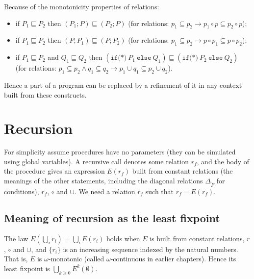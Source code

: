 Because of the monotonicity properties of relations:
\begin{itemize}
  \item if $P_1 \sqsubseteq P_2$ then $(P_1; P) \sqsubseteq (P_2; P)$ (for relations: $p_1 \subseteq p_2 \rightarrow p_1 \circ p \subseteq p_2 \circ p$);
  \item if $P_1 \sqsubseteq P_2$ then $(P; P_1) \sqsubseteq (P; P_2)$ (for relations: $p_1 \subseteq p_2 \rightarrow p \circ p_1 \subseteq p \circ p_2$);
  \item if $P_1 \sqsubseteq P_2$ and $Q_1 \sqsubseteq Q_2$ then $(\texttt{if(*)}\ P_1\ \texttt{else}\ Q_1) \sqsubseteq (\texttt{if(*)}\ P_2\ \texttt{else}\ Q_2)$ (for relations: $p_1 \subseteq p_2 \wedge q_1 \subseteq q_2 \rightarrow p_1 \cup q_1 \subseteq p_2 \cup q_2$).
\end{itemize}
Hence a part of a program can be replaced by a refinement of it in any context built from these constructs.
 
\section{Recursion}
 
For simplicity assume procedures have no parameters (they can be simulated using global variables). A recursive call denotes some relation $r_f$, and the body of the procedure gives an expression $E(r_f)$ built from constant relations (the meanings of the other statements, including the diagonal relations $\Delta_{\tilde F}$ for conditions), $r_f$, $\circ$ and $\cup$. We need a relation $r_f$ such that $r_f = E(r_f)$.
 
\subsection*{Meaning of recursion as the least fixpoint}
 
The law $E(\bigcup_i r_i) = \bigcup_i E(r_i)$ holds when $E$ is built from constant relations, $r$, $\circ$ and $\cup$, and $\{r_i\}$ is an increasing sequence indexed by the natural numbers. That is, $E$ is $\omega$-monotonic (called $\omega$-continuous in earlier chapters). Hence its least fixpoint is $\bigcup_{k \ge 0} E^k(\emptyset)$.
 
 
